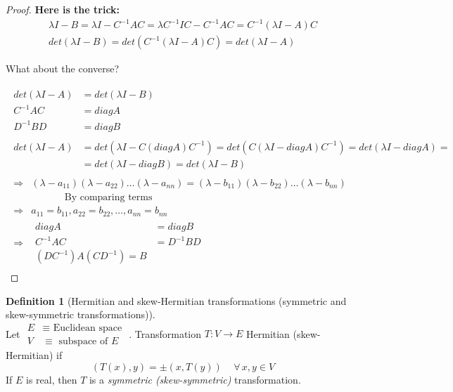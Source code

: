 \documentclass[twoside]{amsart}
\theoremstyle{plain}
\theoremstyle{definition}
\newtheorem{definition}{Definition}
\begin{document}
\begin{proof}
\textbf{Here is the trick:}
\begin{gather*}
\lambda I - B = \lambda I - C^{-1}AC = \lambda C^{-1}IC - C^{-1}AC = C^{-1}(\lambda I -A)C \\
det(\lambda I - B) = det(C^{-1}(\lambda I -A)C) = det(\lambda I -A)
\end{gather*}

What about the converse? 

\begin{gather*}
  \begin{aligned}
    det(\lambda I - A) & = det(\lambda I -B) \\
    C^{-1}AC & = diag A \\
    D^{-1}BD & = diag B 
  \end{aligned} \\
\begin{aligned}
det(\lambda I - A) & = det(\lambda I - C (diag A) C^{-1}) = det(C(\lambda I - diag A) C^{-1}) = det(\lambda I - diag A) = \\
& = det(\lambda I - diag B) = det(\lambda I - B)
\end{aligned} \\
\begin{aligned}
  \Longrightarrow & (\lambda - a_{11})(\lambda - a_{22})\dots (\lambda - a_{nn}) = (\lambda - b_{11})(\lambda - b_{22})\dots (\lambda - b_{nn})  \\
  & \phantom{ l - a 11 }\text{ By comparing terms }\\
  \Longrightarrow & a_{11} = b_{11}, a_{22} = b_{22}, \dots , a_{nn} = b_{nn} \\
  \Longrightarrow & 
  \begin{aligned}
    diag A & = diag B \\
    C^{-1}AC & = D^{-1}B D \\
    (DC^{-1})A(CD^{-1}) = B
  \end{aligned}
\end{aligned}
\end{gather*}
\end{proof}

\begin{definition}[Hermitian and skew-Hermitian transformations (symmetric and skew-symmetric transformations)] \quad \\
  Let $\begin{aligned} E & \equiv \text{ Euclidean space} \\ V & \equiv \text{ subspace of $E$ } \end{aligned}$.  Transformation $T:V \to E$ Hermitian (skew-Hermitian) if 
\begin{equation}
  (T(x),y) = \pm (x,T(y)) \quad \, \forall \, x, y \in V
\end{equation}
If $E$ is real, then $T$ is a \emph{symmetric (skew-symmetric)} transformation.
\end{definition}
\end{document}
